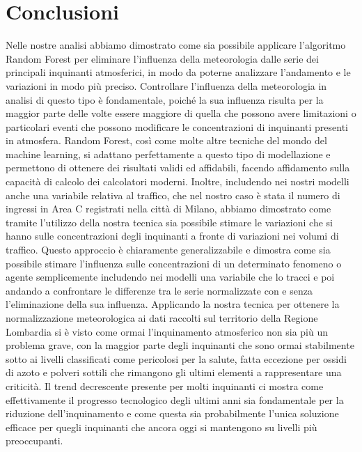 \documentclass[a4paper]{report}
\begin{document}
\chapter{Conclusioni}
Nelle nostre analisi abbiamo dimostrato come sia possibile applicare l'algoritmo Random Forest per eliminare l'influenza della meteorologia dalle serie dei principali inquinanti atmosferici, in modo da poterne analizzare l'andamento e le variazioni in modo più preciso.  
Controllare l'influenza della meteorologia in analisi di questo tipo è fondamentale, poiché la sua influenza risulta per la maggior parte delle volte essere maggiore di quella che possono avere limitazioni o particolari eventi che possono modificare le concentrazioni di inquinanti presenti in atmosfera. Random Forest, così come molte altre tecniche del mondo del machine learning, si adattano perfettamente a questo tipo di modellazione e permettono di ottenere dei risultati validi ed affidabili, facendo affidamento sulla capacità di calcolo dei calcolatori moderni.  
Inoltre, includendo nei nostri modelli anche una variabile relativa al traffico, che nel nostro caso è stata il numero di ingressi in Area C registrati nella città di Milano, abbiamo dimostrato come tramite l'utilizzo della nostra tecnica sia possibile stimare le variazioni che si hanno sulle concentrazioni degli inquinanti a fronte di variazioni nei volumi di traffico. Questo approccio è chiaramente generalizzabile e dimostra come sia possibile stimare l'influenza sulle concentrazioni di un determinato fenomeno o agente semplicemente includendo nei modelli una variabile che lo tracci e poi andando a confrontare le differenze tra le serie normalizzate con e senza l'eliminazione della sua influenza.
Applicando la nostra tecnica per ottenere la normalizzazione meteorologica ai dati raccolti sul territorio della Regione Lombardia si è visto come ormai l'inquinamento atmosferico non sia più un problema grave, con la maggior parte degli inquinanti che sono ormai stabilmente sotto ai livelli classificati come pericolosi per la salute, fatta eccezione per ossidi di azoto e polveri sottili che rimangono gli ultimi elementi a rappresentare una criticità. 
Il trend decrescente presente per molti inquinanti ci mostra come effettivamente il progresso tecnologico degli ultimi anni sia fondamentale per la riduzione dell'inquinamento e come questa sia probabilmente l'unica soluzione efficace per quegli inquinanti che ancora oggi si mantengono su livelli più preoccupanti.  
\end{document}
